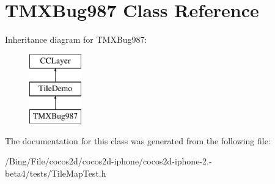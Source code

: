 \hypertarget{interface_t_m_x_bug987}{\section{T\-M\-X\-Bug987 Class Reference}
\label{interface_t_m_x_bug987}
}
Inheritance diagram for T\-M\-X\-Bug987\-:\begin{figure}[H]
\begin{center}
\leavevmode
\includegraphics[height=3.000000cm]{interface_t_m_x_bug987}
\end{center}
\end{figure}


The documentation for this class was generated from the following file\-:\begin{DoxyCompactItemize}
\item 
/\-Bing/\-File/cocos2d/cocos2d-\/iphone/cocos2d-\/iphone-\/2.-\/beta4/tests/Tile\-Map\-Test.\-h\end{DoxyCompactItemize}
